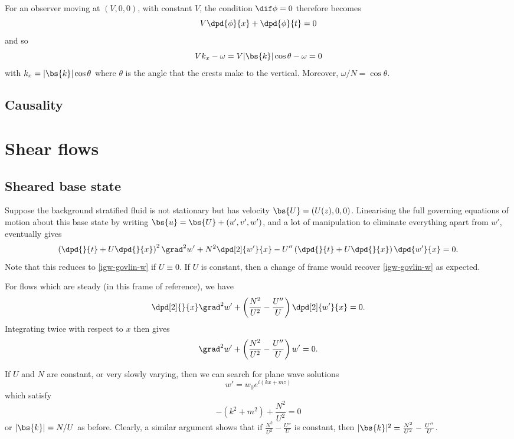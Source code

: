 For an observer moving at $(V,0,0)$, with constant $V$, the condition
$\dif\phi=0$ therefore becomes
\begin{equation}
    V\dpd{\phi}{x} + \dpd{\phi}{t} = 0
\end{equation}
and so
\begin{equation}
    V k_x - \omega = V|\bs{k}|\cos\theta - \omega = 0
\end{equation}
with $k_x = |\bs{k}|\cos\theta$ where $\theta$ is the angle that the crests
make to the vertical. Moreover, $\omega/N = \cos\theta$.

\subsection{Causality}

\section{Shear flows}

\subsection{Sheared base state}

Suppose the background stratified fluid is not stationary but has velocity
$\bs{U} = (U(z),0,0)$. Linearising the full governing equations of motion about
this base state by writing $\bs{u} = \bs{U} + (u',v',w')$, and a lot of
manipulation to eliminate everything apart from $w'$, eventually gives
\begin{equation}
	\left(\dpd{}{t} + U\dpd{}{x}\right)^2 \grad^2 w' + N^2 \dpd[2]{w'}{x} - U''\left(\dpd{}{t} + U\dpd{}{x}\right)\dpd{w'}{x} = 0.
\end{equation}
Note that this reduces to \ref{igw-govlin-w} if $U\equiv0$. If $U$ is constant, then a change of frame would recover \ref{igw-govlin-w} as expected.

For flows which are steady (in this frame of reference), we have
\begin{equation}
	\dpd[2]{}{x} \grad^2 w' + \left( \frac{N^2}{U^2} - \frac{U''}{U} \right)\dpd[2]{w'}{x} = 0.
\end{equation}
Integrating twice with respect to $x$ then gives
\begin{equation}
	\grad^2 w' + \left( \frac{N^2}{U^2} - \frac{U''}{U} \right) w' = 0.
\end{equation}

If $U$ and $N$ are constant, or very slowly varying, then we can search for plane wave solutions
\begin{equation}
	w' = w_0 e^{i(kx+mz)}
\end{equation}
which satisfy
\begin{equation}
	-(k^2 + m^2) + \frac{N^2}{U^2} = 0
\end{equation}
or $|\bs{k}| = N/U$ as before. Clearly, a similar argument shows that if
$\frac{N^2}{U^2} - \frac{U''}{U} $ is constant, then
$|\bs{k}|^2=\frac{N^2}{U^2}-\frac{U''}{U}$.

